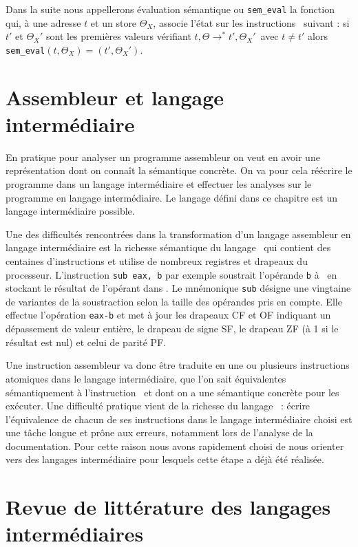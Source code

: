 Dans la suite nous appellerons évaluation sémantique ou \texttt{sem\_eval} la fonction qui, à une adresse $t$ et un store $\Theta_X$, associe l'état sur les instructions \xq\ suivant : si $t'$ et $\Theta_X'$ sont les premières valeurs vérifiant \textlangle$t, \Theta$\textrangle$\rightarrow^*$\textlangle$t', \Theta_X'$\textrangle\ avec $t\ne t'$ alors \texttt{sem\_eval}$(t, \Theta_X)=(t', \Theta_X')$.


\section{Assembleur et langage intermédiaire}
En pratique pour analyser un programme assembleur on veut en avoir une représentation dont on connaît la sémantique concrète.
On va pour cela réécrire le programme dans un langage intermédiaire et effectuer les analyses sur le programme en langage intermédiaire.
Le langage défini dans ce chapitre est un langage intermédiaire possible.

Une des difficultés rencontrées dans la transformation d'un langage assembleur en langage intermédiaire est la richesse sémantique du langage \xq\ qui contient des centaines d'instructions et utilise de nombreux registres et drapeaux du processeur.
L'instruction \texttt{sub eax, b} par exemple soustrait l'opérande \texttt{b} à \eax\  en stockant le résultat de l'opérant dans \eax.
Le mnémonique \texttt{sub} désigne une vingtaine de variantes de la soustraction selon la taille des opérandes pris en compte. Elle effectue l'opération \texttt{eax-b} et met à jour les drapeaux CF et OF indiquant un dépassement de valeur entière, le drapeau de signe SF, le drapeau ZF (à 1 si le résultat est nul) et celui de parité PF.

Une instruction assembleur va donc être traduite en une ou plusieurs instructions atomiques dans le langage intermédiaire, que l'on sait équivalentes sémantiquement à l'instruction \xq\ et dont on a une sémantique concrète pour les exécuter.
Une difficulté pratique vient de la richesse du langage \xq\ : écrire l'équivalence de chacun de ses instructions dans le langage intermédiaire choisi est une tâche longue et prône aux erreurs, notamment lors de l'analyse de la documentation. 
Pour cette raison nous avons rapidement choisi de nous orienter vers des langages intermédiaire pour lesquels cette étape a déjà été réalisée.

\section{Revue de littérature des langages intermédiaires}


